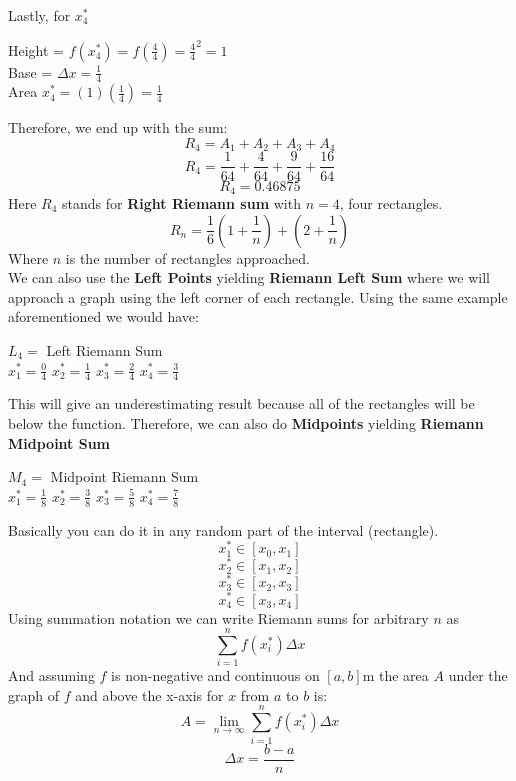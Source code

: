 \documentclass[12pt, letterpaper]{article}
\begin{document}
Lastly, for \(x_4^*\)
\begin{center}
    Height = \(f(x_4^*)=f(\frac{4}{4})=\frac{4}{4}^2=1\)\\
    Base = \(\Delta x = \frac{1}{4}\)\\
    Area \(x_4^*=(1)(\frac{1}{4})=\frac{1}{4}\)
\end{center}
Therefore, we end up with the sum:
\[R_4 = A_1+A_2+A_3+A_4\]
\[R_4 = \frac{1}{64}+\frac{4}{64}+\frac{9}{64}+\frac{16}{64}\]
\[R_4 = 0.46875\]
Here \(R_4\) stands for \textbf{Right Riemann sum} with \(n=4\), four rectangles.
\[R_n = \frac{1}{6} \left( 1+\frac{1}{n} \right)+\left( 2+\frac{1}{n} \right)\]
Where \(n\) is the number of rectangles approached.\\
\newline
We can also use the \textbf{Left Points} yielding \textbf{Riemann Left Sum} where we will approach a graph using the left corner of each rectangle. Using the same example aforementioned we would have:
\begin{center}
    \(L_4 = \) Left Riemann Sum\\
    \(x_1^*=\frac{0}{4}\)
    \(x_2^*=\frac{1}{4}\)
    \(x_3^*=\frac{2}{4}\)
    \(x_4^*=\frac{3}{4}\)
\end{center}
This will give an underestimating result because all of the rectangles will be below the function. Therefore, we can also do \textbf{Midpoints} yielding \textbf{Riemann Midpoint Sum}
\begin{center}
    \(M_4 = \) Midpoint Riemann Sum\\
    \(x_1^*=\frac{1}{8}\)
    \(x_2^*=\frac{3}{8}\)
    \(x_3^*=\frac{5}{8}\)
    \(x_4^*=\frac{7}{8}\)
\end{center}
Basically you can do it in any random part of the interval (rectangle).
\[x_1^* \in [x_0,x_1]\]
\[x_2^* \in [x_1,x_2]\]
\[x_3^* \in [x_2,x_3]\]
\[x_4^* \in [x_3,x_4]\]
Using summation notation we can write Riemann sums for arbitrary \(n\) as
\[ \sum_{i=1}^{n} f(x_i^*)\Delta x \]
And assuming \(f\) is non-negative and continuous on \([a,b]\)m the area \(A\) under the graph of \(f\) and above the x-axis for \(x\) from \(a\) to \(b\) is:
\[ A = \lim_{n \to \infty} \sum_{i=1}^{n} f(x_i^*)\Delta x \]
\[\Delta x=\frac{b-a}{n}\]
\end{document}

